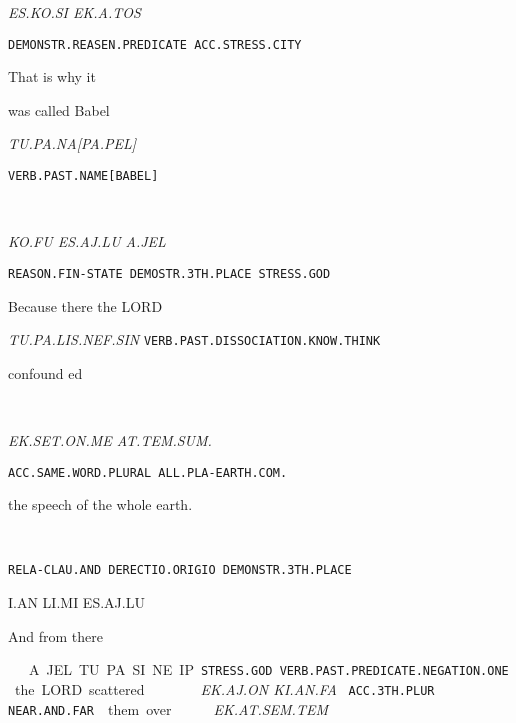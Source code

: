 {{\it ES.KO.SI				EK.A.TOS		 }

{\tt DEMONSTR.REASEN.PREDICATE	ACC.STRESS.CITY	 }

That is why 				it 			

\drie
 
was called Babel 

{\it TU.PA.NA[PA.PEL] }

{\tt VERB.PAST.NAME[BABEL] }

\tu\pa\na\cartouche{\pa\pel}

\drie


\ko\fu~\es\aj\lu~\Atlana\jel

{\it KO.FU			ES.AJ.LU			A.JEL }

{\tt REASON.FIN-STATE          DEMOSTR.3TH.PLACE		STRESS.GOD }

Because 		there 				the LORD  
\drie

\tu\pa\lis\nef\Atlansin

{\it TU.PA.LIS.NEF.SIN}                                              			 
{\tt VERB.PAST.DISSOCIATION.KNOW.THINK	 }

confound ed 
\drie

 

\at\tem\Atlansum~\ek\set\on\me\period

{\it EK.SET.ON.ME      AT.TEM.SUM.			}


{\tt ACC.SAME.WORD.PLURAL 	ALL.PLA-EARTH.COM. }

the speech			 of the whole earth.

\drie

\Atlani\an~\li\mi~\es\aj\lu

{\tt RELA-CLAU.AND	DERECTIO.ORIGIO      DEMONSTR.3TH.PLACE }

I.AN			LI.MI			ES.AJ.LU			 

And 			from 			there 		
\drie

\Atlana\jel~\tu\pa\si\Atlanne\ip

A.JEL		TU.PA.SI.NE.IP    

{\tt STRESS.GOD	VERB.PAST.PREDICATE.NEGATION.ONE }

the LORD	scattered 
\drie

 
\ek\aj\on~\ki\an\fa

{\it EK.AJ.ON	KI.AN.FA               }

{\tt ACC.3TH.PLUR	NEAR.AND.FAR	 }

them 		over 		 
\drie
  
\ek\at\sem\tem

{\it EK.AT.SEM.TEM }

}

